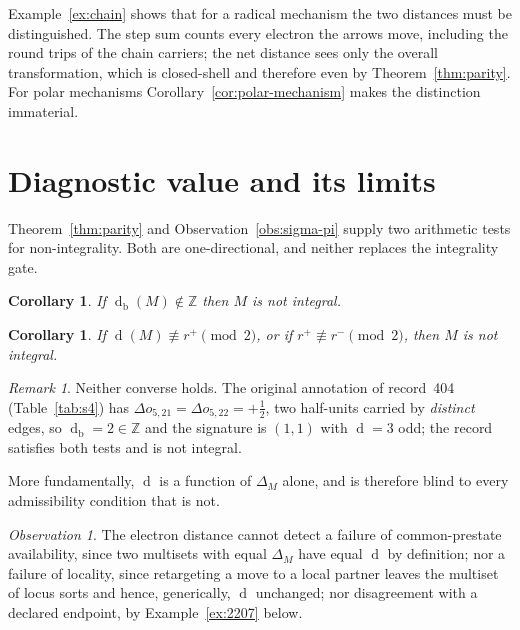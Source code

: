 \documentclass[11pt]{article}
\numberwithin{equation}{section}
\newcommand{\del}{\operatorname{d}}
\theoremstyle{plain}
\newtheorem{corollary}[theorem]{Corollary}
\theoremstyle{definition}
\theoremstyle{remark}
\newtheorem{observation}{Observation}
\newtheorem{remark}[theorem]{Remark}
\begin{document}
Example~\ref{ex:chain} shows that for a radical mechanism the two distances
must be distinguished.  The step sum counts every electron the arrows move,
including the round trips of the chain carriers; the net distance sees only
the overall transformation, which is closed-shell and therefore even by
Theorem~\ref{thm:parity}.  For polar mechanisms
Corollary~\ref{cor:polar-mechanism} makes the distinction immaterial.

\section{Diagnostic value and its limits}
\label{sec:diagnostics}

Theorem~\ref{thm:parity} and Observation~\ref{obs:sigma-pi} supply two
arithmetic tests for non-integrality.  Both are one-directional, and neither
replaces the integrality gate.

\begin{corollary}
\label{cor:diag-fractional}
If $\del_{\mathrm b}(M)\notin\mathbb Z$ then $M$ is not integral.
\end{corollary}

\begin{corollary}
\label{cor:diag-parity}
If $\del(M)\not\equiv r^+\pmod2$, or if $r^+\not\equiv r^-\pmod 2$, then $M$
is not integral.
\end{corollary}

\begin{remark}
\label{rem:diag-limits}
Neither converse holds.  The original annotation of record~404
(Table~\ref{tab:s4}) has $\Delta o_{5,21}=\Delta o_{5,22}=+\tfrac12$, two
half-units carried by \emph{distinct} edges, so $\del_{\mathrm b}=2\in\mathbb Z$
and the signature is $(1,1)$ with $\del=3$ odd; the record satisfies both
tests and is not integral.
\end{remark}

More fundamentally, $\del$ is a function of $\Delta_M$ alone, and is therefore
blind to every admissibility condition that is not.

\begin{observation}
\label{obs:blind}
The electron distance cannot detect a failure of common-prestate availability,
since two multisets with equal $\Delta_M$ have equal $\del$ by definition;
nor a failure of locality, since retargeting a move to a local partner leaves
the multiset of locus sorts and hence, generically, $\del$ unchanged; nor
disagreement with a declared endpoint, by Example~\ref{ex:2207} below.
\end{observation}
\end{document}
